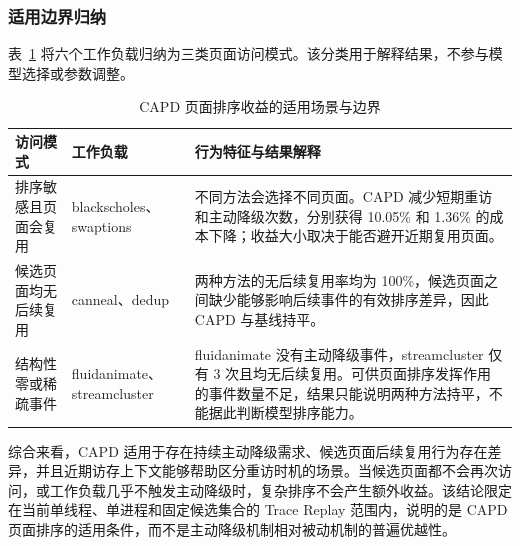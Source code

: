 \subsubsection{\heiti 适用边界归纳}

表~\ref{tab:capd-applicability} 将六个工作负载归纳为三类页面访问模式。该分类用于解释结果，不参与模型选择或参数调整。

\begin{table}[htbp]
  \centering
  \small
  \caption{CAPD 页面排序收益的适用场景与边界}
  \label{tab:capd-applicability}
  \renewcommand{\arraystretch}{1.18}
  \setlength{\tabcolsep}{5pt}
  \begin{tabular}{p{2.6cm}p{2.7cm}p{8.2cm}}
    \toprule
    访问模式 & 工作负载 & 行为特征与结果解释 \\
    \midrule
    排序敏感且页面会复用
      & blackscholes、swaptions
      & 不同方法会选择不同页面。CAPD 减少短期重访和主动降级次数，分别获得 10.05\% 和 1.36\% 的成本下降；收益大小取决于能否避开近期复用页面。 \\
    候选页面均无后续复用
      & canneal、dedup
      & 两种方法的无后续复用率均为 100\%，候选页面之间缺少能够影响后续事件的有效排序差异，因此 CAPD 与基线持平。 \\
    结构性零或稀疏事件
      & fluidanimate、streamcluster
      & fluidanimate 没有主动降级事件，streamcluster 仅有 3 次且均无后续复用。可供页面排序发挥作用的事件数量不足，结果只能说明两种方法持平，不能据此判断模型排序能力。 \\
    \bottomrule
  \end{tabular}
\end{table}

综合来看，CAPD 适用于存在持续主动降级需求、候选页面后续复用行为存在差异，并且近期访存上下文能够帮助区分重访时机的场景。当候选页面都不会再次访问，或工作负载几乎不触发主动降级时，复杂排序不会产生额外收益。该结论限定在当前单线程、单进程和固定候选集合的 Trace Replay 范围内，说明的是 CAPD 页面排序的适用条件，而不是主动降级机制相对被动机制的普遍优越性。
